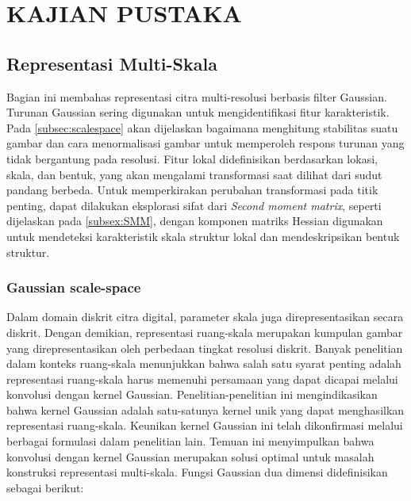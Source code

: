 
\chapter{KAJIAN PUSTAKA}

\section{Representasi Multi-Skala}

  Bagian ini membahas representasi citra multi-resolusi berbasis filter Gaussian. Turunan Gaussian sering digunakan untuk mengidentifikasi fitur karakteristik. Pada \ref{subsec:scalespace} akan dijelaskan bagaimana menghitung stabilitas suatu gambar dan cara menormalisasi gambar untuk memperoleh respons turunan yang tidak bergantung pada resolusi. Fitur lokal didefinisikan berdasarkan lokasi, skala, dan bentuk, yang akan mengalami transformasi saat dilihat dari sudut pandang berbeda. Untuk memperkirakan perubahan transformasi pada titik penting, dapat dilakukan eksplorasi sifat dari \emph{Second moment matrix}, seperti dijelaskan pada \ref{subsex:SMM}, dengan komponen matriks Hessian digunakan untuk mendeteksi karakteristik skala struktur lokal dan mendeskripsikan bentuk struktur.

\subsection{Gaussian scale-space}

Dalam domain diskrit citra digital, parameter skala juga direpresentasikan secara diskrit. Dengan demikian, representasi ruang-skala merupakan kumpulan gambar yang direpresentasikan oleh perbedaan tingkat resolusi diskrit. Banyak penelitian dalam konteks ruang-skala menunjukkan bahwa salah satu syarat penting adalah representasi ruang-skala harus memenuhi persamaan yang dapat dicapai melalui konvolusi dengan kernel Gaussian. Penelitian-penelitian ini mengindikasikan bahwa kernel Gaussian adalah satu-satunya kernel unik yang dapat menghasilkan representasi ruang-skala. Keunikan kernel Gaussian ini telah dikonfirmasi melalui berbagai formulasi dalam penelitian lain. Temuan ini menyimpulkan bahwa konvolusi dengan kernel Gaussian merupakan solusi optimal untuk masalah konstruksi representasi multi-skala. Fungsi Gaussian dua dimensi didefinisikan sebagai berikut:


